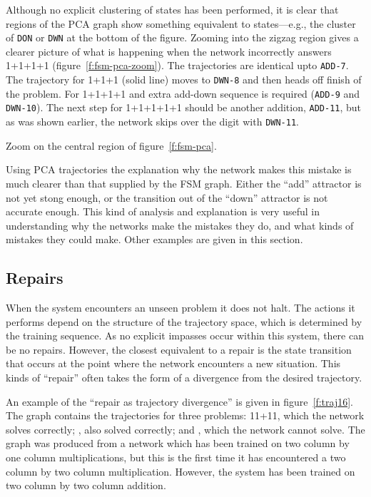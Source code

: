 Although no explicit clustering of states has been performed, it is clear
that regions of the PCA graph show something equivalent to states---e.g.,
the cluster of \verb|DON| or \verb|DWN| at the bottom of the figure.
Zooming into the zigzag region gives a clearer picture of what is
happening when the network incorrectly answers 1+1+1+1
(figure~\ref{f:fsm-pca-zoom}).  The trajectories are identical upto
\verb|ADD-7|.  The trajectory for 1+1+1 (solid line) moves to \verb|DWN-8|
and then heads off finish of the problem.  For 1+1+1+1 and extra add-down
sequence is required (\verb|ADD-9| and \verb|DWN-10|).  The next step for
1+1+1+1+1 should be another addition, \verb|ADD-11|, but as was shown
earlier, the network skips over the digit with \verb|DWN-11|.


\begin{fancyfigure}
\centerline{}
\caption{Zoom on the central region of figure~\protect\ref{f:fsm-pca}.
}\label{f:fsm-pca-zoom}
\end{fancyfigure}


Using PCA trajectories the explanation why the network makes this
mistake is much clearer than that supplied by the FSM graph.  Either the
``add'' attractor is not yet stong enough, or the transition out of the
``down'' attractor is not accurate enough.  This kind of analysis and
explanation is very useful in understanding why the networks make the
mistakes they do, and what kinds of mistakes they could make.  Other
examples are given in this section.



\subsection{Repairs}

When the system encounters an unseen problem it does not halt.  The actions
it performs depend on the structure of the trajectory space, which is
determined by the training sequence. As no explicit impasses occur within
this system, there can be no repairs. However, the closest equivalent to a
repair is the state transition that occurs at the point where the network
encounters a new situation.
This kinds of ``repair'' often takes the form of a
divergence from the desired trajectory.

An example of the ``repair as trajectory divergence'' is given in
figure~\ref{f:traj16}.
The graph contains the trajectories for three problems: 11+11,
which the network solves correctly; , also solved correctly; and
, which the network cannot solve.  The graph was produced from a
network which has been trained on two column by one column multiplications,
but this is the first time it has encountered a two column by two column
multiplication.  However, the system
has been trained on two column by two column
addition.

